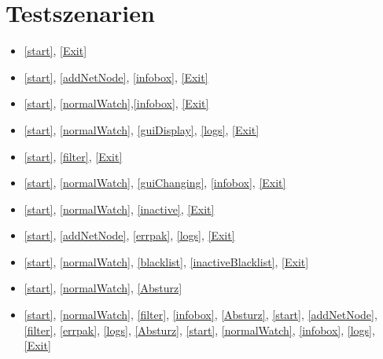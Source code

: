 \section{Testszenarien}

\begin{itemize}
  \item \ref{start}, \ref{Exit}
  \item \ref{start}, \ref{addNetNode}, \ref{infobox}, \ref{Exit}
  \item \ref{start}, \ref{normalWatch},\ref{infobox}, \ref{Exit}
  \item \ref{start}, \ref{normalWatch}, \ref{guiDisplay}, \ref{logs}, \ref{Exit}
  \item \ref{start}, \ref{filter}, \ref{Exit}
  \item \ref{start}, \ref{normalWatch}, \ref{guiChanging}, \ref{infobox}, \ref{Exit}
  \item \ref{start}, \ref{normalWatch}, \ref{inactive}, \ref{Exit}
  \item \ref{start}, \ref{addNetNode}, \ref{errpak}, \ref{logs}, \ref{Exit}
  \item \ref{start}, \ref{normalWatch}, \ref{blacklist}, \ref{inactiveBlacklist}, \ref{Exit}
  \item \ref{start}, \ref{normalWatch}, \ref{Absturz}
  \item \ref{start}, \ref{normalWatch}, \ref{filter}, \ref{infobox}, \ref{Absturz}, \ref{start}, \ref{addNetNode}, \ref{filter}, \ref{errpak}, \ref{logs}, \ref{Absturz}, \ref{start}, \ref{normalWatch}, \ref{infobox}, \ref{logs}, \ref{Exit}
\end{itemize}
